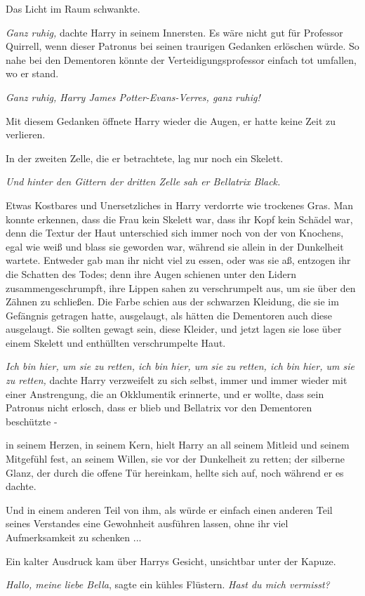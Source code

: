 Das Licht im Raum schwankte.

\emph{Ganz ruhig,} dachte Harry in seinem Innersten. Es wäre nicht gut für
Professor Quirrell, wenn dieser Patronus bei seinen traurigen Gedanken erlöschen
würde. So nahe bei den Dementoren könnte der Verteidigungsprofessor einfach tot
umfallen, wo er stand.

\emph{Ganz ruhig, Harry James Potter-Evans-Verres, ganz ruhig!}

Mit diesem Gedanken öffnete Harry wieder die Augen, er hatte keine Zeit zu
verlieren.

In der zweiten Zelle, die er betrachtete, lag nur noch ein Skelett.

\emph{Und hinter den Gittern der dritten Zelle sah er Bellatrix Black.}

Etwas Kostbares und Unersetzliches in Harry verdorrte wie trockenes Gras. Man
konnte erkennen, dass die Frau kein Skelett war, dass ihr Kopf kein Schädel war,
denn die Textur der Haut unterschied sich immer noch von der von Knochens, egal
wie weiß und blass sie geworden war, während sie allein in der Dunkelheit
wartete. Entweder gab man ihr nicht viel zu essen, oder was sie aß, entzogen ihr
die Schatten des Todes; denn ihre Augen schienen unter den Lidern
zusammengeschrumpft, ihre Lippen sahen zu verschrumpelt aus, um sie über den
Zähnen zu schließen. Die Farbe schien aus der schwarzen Kleidung, die sie im
Gefängnis getragen hatte, ausgelaugt, als hätten die Dementoren auch diese
ausgelaugt. Sie sollten gewagt sein, diese Kleider, und jetzt lagen sie lose
über einem Skelett und enthüllten verschrumpelte Haut.

\emph{Ich bin hier, um sie zu retten, ich bin hier, um sie zu retten, ich bin
hier, um sie zu retten,} dachte Harry verzweifelt zu sich selbst, immer und
immer wieder mit einer Anstrengung, die an Okklumentik erinnerte, und er wollte,
dass sein Patronus nicht erlosch, dass er blieb und Bellatrix vor den Dementoren
beschützte -

in seinem Herzen, in seinem Kern, hielt Harry an all seinem Mitleid und seinem
Mitgefühl fest, an seinem Willen, sie vor der Dunkelheit zu retten; der silberne
Glanz, der durch die offene Tür hereinkam, hellte sich auf, noch während er es
dachte.

Und in einem anderen Teil von ihm, als würde er einfach einen anderen Teil
seines Verstandes eine Gewohnheit ausführen lassen, ohne ihr viel Aufmerksamkeit
zu schenken ...

Ein kalter Ausdruck kam über Harrys Gesicht, unsichtbar unter der Kapuze.

\glqq{}\emph{Hallo, meine liebe Bella}\grqq{}, sagte ein kühles Flüstern.
\glqq{}\emph{Hast du mich vermisst?}\grqq{}


